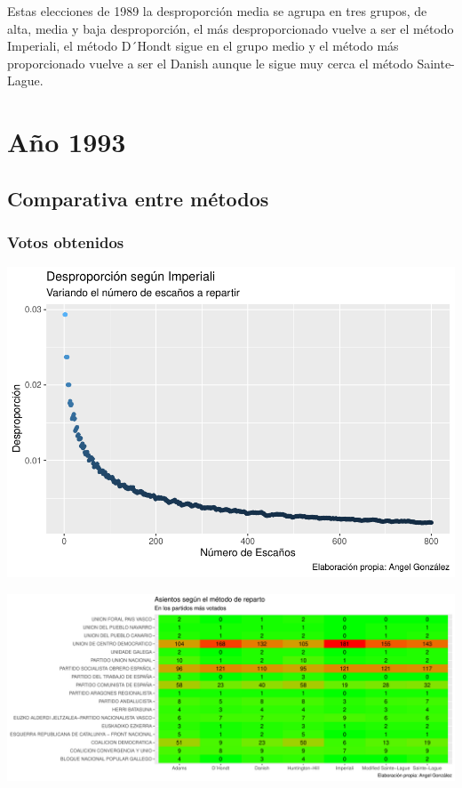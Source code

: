 \documentclass[12pt,a4paper,]{book}
\numberwithin{dummy}{section}
\theoremstyle{ocrenumbox}
\theoremstyle{blacknumex}
\theoremstyle{blacknumbox}
\theoremstyle{ocrenum}
\theoremstyle{ocrenum}
\begin{document}
Estas elecciones de 1989 la desproporción media se agrupa en tres
grupos, de alta, media y baja desproporción, el más desproporcionado
vuelve a ser el método Imperiali, el método D´Hondt sigue en el grupo
medio y el método más proporcionado vuelve a ser el Danish aunque le
sigue muy cerca el método Sainte-Lague.

\hypertarget{auxf1o-1993}{%
\section{Año 1993}\label{auxf1o-1993}}

\hypertarget{comparativa-entre-muxe9todos-5}{%
\subsection{Comparativa entre
métodos}\label{comparativa-entre-muxe9todos-5}}

\hypertarget{votos-obtenidos-5}{%
\subsubsection{Votos obtenidos}\label{votos-obtenidos-5}}

\begin{center}\includegraphics[width=1\linewidth]{figurasR/unnamed-chunk-20-1} \end{center}

\begin{center}\includegraphics[width=1\linewidth]{figurasR/unnamed-chunk-20-2} \end{center}
\end{document}
